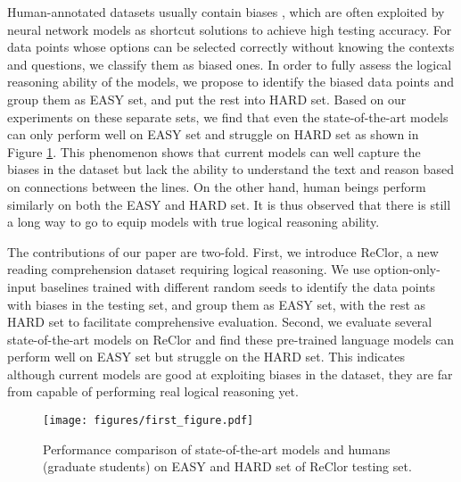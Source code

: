 \documentclass{article} \usepackage{iclr2020_conference,times}
\begin{document}
Human-annotated datasets usually contain biases \citep{schwartz2017story, cai2017pay, bugert2017lsdsem, poliak2018hypothesis, gururangan2018annotation, zellers2019hellaswag}, which are often exploited by neural network models as shortcut solutions to achieve high testing accuracy. For data points whose options can be selected correctly without knowing the contexts and questions, we classify them as biased ones. In order to fully assess the logical reasoning ability of the models, we propose to identify the biased data points and group them as EASY set, and put the rest into HARD set. Based on our experiments on these separate sets, we find that even the state-of-the-art models can only perform well on EASY set and struggle on HARD set as shown in Figure \ref{fig:first_figure}. This phenomenon shows that current models can well capture the biases in the dataset but lack the ability to understand the text and reason based on connections between the lines. On the other hand, human beings perform similarly on both the EASY and HARD set. It is thus observed that there is still a long way to go to equip models with true logical reasoning ability. 
	

The contributions of our paper are two-fold. First, we introduce ReClor, a new reading comprehension dataset requiring logical reasoning. We use option-only-input baselines trained with different random seeds to identify the data points with biases in the testing set, and group them as EASY set, with the rest as HARD set to facilitate comprehensive evaluation. Second, we evaluate several state-of-the-art models on ReClor and find these pre-trained language models can perform well on EASY set but struggle on the HARD set. This indicates although current models are good at exploiting biases in the dataset, they are far from capable of performing real logical reasoning yet.
	
	
\begin{figure}[htbp]
	\begin{center}
\texttt{[image: figures/first\_figure.pdf]}
	\end{center}
	\caption{Performance comparison of state-of-the-art models and humans (graduate students) on EASY and HARD set of ReClor testing set.}
	\label{fig:first_figure}
\end{figure}
	
\end{document}
